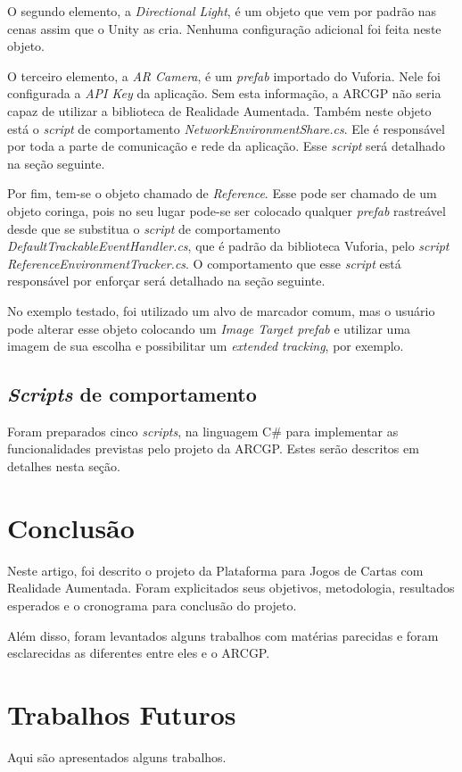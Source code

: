 \documentclass[conference]{IEEEtran}
\begin{document}
O segundo elemento, a \textit{Directional Light}, é um objeto que vem por padrão 
nas cenas assim que o Unity as cria. Nenhuma configuração adicional foi feita 
neste objeto.

O terceiro elemento, a \textit{AR Camera}, é um \textit{prefab} importado do 
Vuforia. Nele foi configurada a \textit{API Key} da aplicação. Sem esta 
informação, a ARCGP não seria capaz de utilizar a biblioteca de Realidade 
Aumentada. Também neste objeto está o \textit{script} de comportamento \textit{
NetworkEnvironmentShare.cs}. Ele é responsável por toda a parte de comunicação 
e rede da aplicação. Esse \textit{script} será detalhado na seção seguinte.

Por fim, tem-se o objeto chamado de \textit{Reference}. Esse pode ser chamado de 
um objeto coringa, pois no seu lugar pode-se ser colocado qualquer \textit{
prefab} rastreável desde que se substitua o \textit{script} de comportamento 
\textit{DefaultTrackableEventHandler.cs}, que é padrão da biblioteca Vuforia, 
pelo \textit{script ReferenceEnvironmentTracker.cs}. O comportamento que esse 
\textit{script} está responsável por enforçar será detalhado na seção seguinte.

No exemplo testado, foi utilizado um alvo de marcador comum, mas o usuário pode 
alterar esse objeto colocando um \textit{Image Target prefab} e utilizar uma 
imagem de sua escolha e possibilitar um \textit{extended tracking}, por exemplo.

\subsection{\textit{Scripts} de comportamento}
\label{scripts}
Foram preparados cinco \textit{scripts}, na linguagem C\# para implementar as 
funcionalidades previstas pelo projeto da ARCGP. Estes serão descritos em 
detalhes nesta seção.

\section{Conclusão}
\label{conclusao}
Neste artigo, foi descrito o projeto da Plataforma para Jogos de Cartas com 
Realidade Aumentada. Foram explicitados seus objetivos, metodologia, resultados 
esperados e o cronograma para conclusão do projeto.

Além disso, foram levantados alguns trabalhos com matérias parecidas e foram 
esclarecidas as diferentes entre eles e o ARCGP.

\section{Trabalhos Futuros}
\label{trab_fut}
Aqui são apresentados alguns trabalhos.



\end{document}
